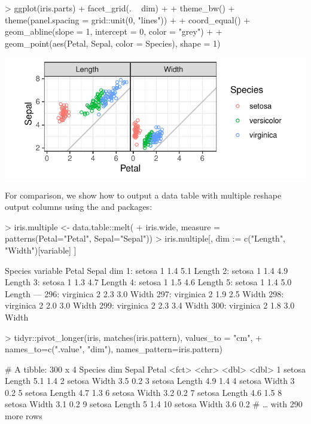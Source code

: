 \begin{Schunk}
\begin{Sinput}
> ggplot(iris.parts) + facet_grid(. ~ dim) +
+   theme_bw() + theme(panel.spacing = grid::unit(0, "lines")) +
+   coord_equal() + geom_abline(slope = 1, intercept = 0, color = "grey") +
+   geom_point(aes(Petal, Sepal, color = Species), shape = 1)
\end{Sinput}
\end{Schunk}
\includegraphics{hocking-scatter}

For comparison, we show how to output a data table with multiple
reshape output columns using the  and 
packages:

\begin{Schunk}
\begin{Sinput}
> iris.multiple <- data.table::melt(
+   iris.wide, measure = patterns(Petal="Petal", Sepal="Sepal"))
> iris.multiple[, dim := c("Length", "Width")[variable] ]
\end{Sinput}
\begin{Soutput}
       Species variable Petal Sepal    dim
  1:    setosa        1   1.4   5.1 Length
  2:    setosa        1   1.4   4.9 Length
  3:    setosa        1   1.3   4.7 Length
  4:    setosa        1   1.5   4.6 Length
  5:    setosa        1   1.4   5.0 Length
 ---                                      
296: virginica        2   2.3   3.0  Width
297: virginica        2   1.9   2.5  Width
298: virginica        2   2.0   3.0  Width
299: virginica        2   2.3   3.4  Width
300: virginica        2   1.8   3.0  Width
\end{Soutput}
\begin{Sinput}
> tidyr::pivot_longer(iris, matches(iris.pattern), values_to = "cm",
+   names_to=c(".value", "dim"), names_pattern=iris.pattern)
\end{Sinput}
\begin{Soutput}
# A tibble: 300 x 4
   Species dim    Sepal Petal
   <fct>   <chr>  <dbl> <dbl>
 1 setosa  Length   5.1   1.4
 2 setosa  Width    3.5   0.2
 3 setosa  Length   4.9   1.4
 4 setosa  Width    3     0.2
 5 setosa  Length   4.7   1.3
 6 setosa  Width    3.2   0.2
 7 setosa  Length   4.6   1.5
 8 setosa  Width    3.1   0.2
 9 setosa  Length   5     1.4
10 setosa  Width    3.6   0.2
# … with 290 more rows
\end{Soutput}
\end{Schunk}


